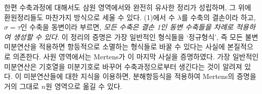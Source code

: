 한편 수축과정에 대해서도 삼원 영역에서와 완전히 유사한 정리가 성립하며, 그 위에 환원정리들도 마찬가지 방식으로 세울 수 있다. (1)에서 수 \(\lambda\)를 수축의 결손이라 하고, \(\sigma=\tau\)인 수축을 동변이라 부르면, \emph{모든 수축은 결손 1인 동변 수축들을 차례로 적용하여 생성할 수 있다}. 이 정리의 증명은 가장 일반적인 형식들을 ‘정규형식’, 즉 모든 불변 미분연산을 적용하면 항등적으로 소멸하는 형식들로 바꿀 수 있다는 사실에 본질적으로 의존한다. 사원 영역에서는 Mertens가 이 마지막 사실을 증명하였다. 가장 일반적인 미분연산은 기호열을 미분기호로 바꾸어 수축과정으로부터 생긴다는 것이 알려져 있다. 이 미분연산들에 대한 지식을 이용하면, 분해항등식을 적용하여 Mertens의 증명을 거의 그대로 \(n\)원 영역으로 옮길 수 있다.

